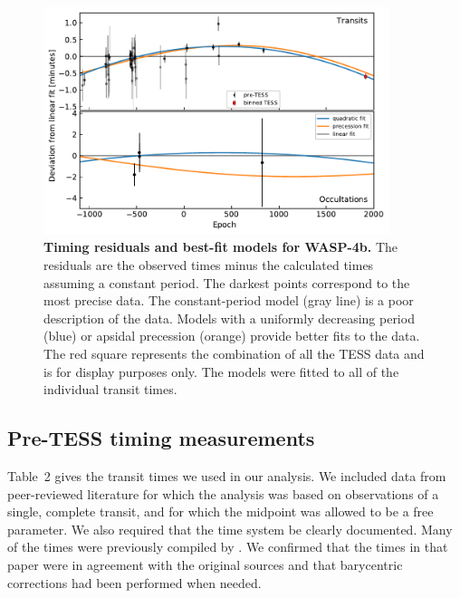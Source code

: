 \documentclass[12pt,twocolumn,tighten]{aastex62}
\begin{document}
\begin{figure}[t]
	\begin{center}
		\leavevmode
		\includegraphics[width=0.9\textwidth]{f4.pdf}
	\end{center}
	\vspace{-0.7cm}
	\caption{ {\bf Timing residuals and best-fit models for WASP-4b.}
		The residuals are the observed times minus the calculated times
		assuming a constant period.  The darkest points correspond to
		the most precise data. The constant-period model (gray line) is
		a poor description of the data.  Models with a uniformly
		decreasing period (blue) or apsidal precession (orange) provide
		better fits to the data.  The red square represents the
		combination of all the TESS data and is for display purposes
		only.  The models were fitted to all of the individual transit
		times.
		\label{fig:times}
	}
\end{figure}


\subsection{Pre-TESS timing measurements}
\label{subsec:times}

Table~2 gives the transit times we used in our analysis. We included
data from peer-reviewed literature for which the analysis was based on
observations of a single, complete transit, and for which the midpoint
was allowed to be a free parameter. We also required that the time
system be clearly documented. Many of the times were previously
compiled by \citet{hoyer_tramos_2013}. We confirmed that the times in
that paper were in agreement with the original sources and that
barycentric corrections had been performed when needed.
\end{document}
